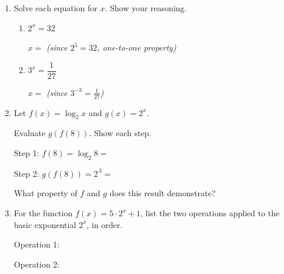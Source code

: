 \documentclass[10pt]{article}
\begin{document}
\namedateperiod

\vspace{0.15in}

\begin{enumerate}[leftmargin=1.8em, itemsep=16pt]

\item Solve each equation for $x$. Show your reasoning.

\vspace{6pt}
\begin{enumerate}[leftmargin=1.5em, itemsep=10pt, label=\alph*.]
  \item $2^x = 32$

  \vspace{6pt}
  $x = $  \quad \textit{(since $2^5 = 32$, one-to-one property)}

  \item $3^x = \dfrac{1}{27}$

  \vspace{6pt}
  $x = $  \quad \textit{(since $3^{-3} = \tfrac{1}{27}$)}
\end{enumerate}

\item Let $f(x) = \log_2 x$ and $g(x) = 2^x$.

\vspace{6pt}
Evaluate $g(f(8))$. Show each step.

\vspace{6pt}
Step 1: $f(8) = \log_2 8 = $ 

\vspace{6pt}
Step 2: $g(f(8)) = 2^{\,3} = $ 

\vspace{8pt}
What property of $f$ and $g$ does this result demonstrate?


\item For the function $f(x) = 5 \cdot 2^x + 1$, list the two operations applied to the
      basic exponential $2^x$, in order.

\vspace{6pt}
Operation 1: 

\vspace{6pt}
Operation 2: 

\end{enumerate}
\end{document}
